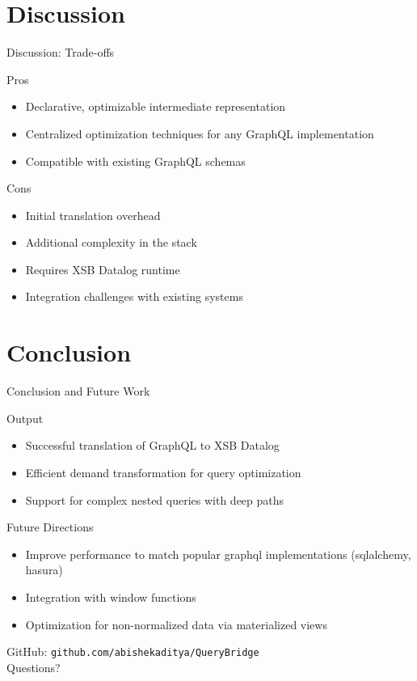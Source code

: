 \documentclass{beamer}
\begin{document}
\section{Discussion}
\begin{frame}{Discussion: Trade-offs}
  \begin{block}{Pros}
    \begin{itemize}
      \item Declarative, optimizable intermediate representation
      \item Centralized optimization techniques for any GraphQL implementation
      \item Compatible with existing GraphQL schemas
    \end{itemize}
  \end{block}
  \begin{block}{Cons}
    \begin{itemize}
      \item Initial translation overhead
      \item Additional complexity in the stack
      \item Requires XSB Datalog runtime
      \item Integration challenges with existing systems
    \end{itemize}
  \end{block}
\end{frame}

\section{Conclusion}
\begin{frame}{Conclusion and Future Work}
  \begin{block}{Output}
    \begin{itemize}
      \item Successful translation of GraphQL to XSB Datalog
      \item Efficient demand transformation for query optimization
      \item Support for complex nested queries with deep paths
    \end{itemize}
  \end{block}
  
  \begin{block}{Future Directions}
    \begin{itemize}
      \item Improve performance to match popular graphql implementations (sqlalchemy, hasura)
      \item Integration with window functions
      \item Optimization for non-normalized data via materialized views
    \end{itemize}
  \end{block}
  
  \vspace{0.3cm}
  \centering GitHub: \texttt{github.com/abishekaditya/QueryBridge}
  \bigskip
  \\
  Questions?
\end{frame}

\end{document}
